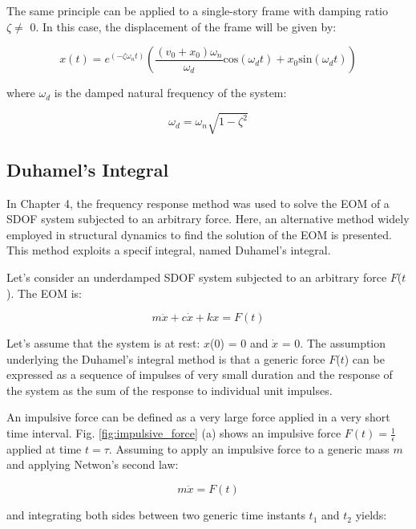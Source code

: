 \documentclass[12pt,letter]{article}
\numberwithin{ex}{section} %
\numberwithin{re}{section} %
\begin{document}
The same principle can be applied to a single-story frame with damping ratio $\zeta \neq$ 0. In this case, the displacement of the frame will be given by:

\begin{equation}
x(t) = e^{(-\zeta\omega_nt)} \left( \frac{({v_0} + x_0)\omega_n}{\omega_d} \text{cos}(\omega_d t) + x_0 \text{sin}(\omega_dt) \right)
\end{equation} 

where $\omega_d$ is the damped natural frequency of the system:

\begin{equation}
\omega_d = \omega_n \sqrt{1 - \zeta^2}
\end{equation}



\subsection{Duhamel's Integral}

In Chapter 4, the frequency response method was used to solve the EOM of a SDOF system subjected to an arbitrary force. Here, an alternative method widely employed in structural dynamics to find the solution of the EOM is presented. This method exploits a specif integral, named Duhamel's integral. 

Let's consider an underdamped SDOF system subjected to an arbitrary force $F$($t$). The EOM is:


\begin{equation}
m \ddot{x} + c \dot{x} + k x = F(t)
\end{equation}

Let's assume that the system is at rest: $x$(0) = 0 and $\dot{x}$ = 0. The assumption underlying the Duhamel's integral method is that a generic force $F$($t$) can be expressed as a sequence of impulses of very small duration and the response of the system as the sum of the response to individual unit impulses. 

An impulsive force can be defined as a very large force applied in a very short time interval. Fig. \ref{fig:impulsive_force} (a) shows an impulsive force $F(t) = \frac{1}{\epsilon}$ applied at time $t = \tau$. Assuming to apply an impulsive force to a generic mass $m$ and applying Netwon's second law:

\begin{equation}
m \ddot{x} = F(t)
\end{equation}

and integrating both sides between two generic time instants $t_1$ and $t_2$ yields:
\end{document}

